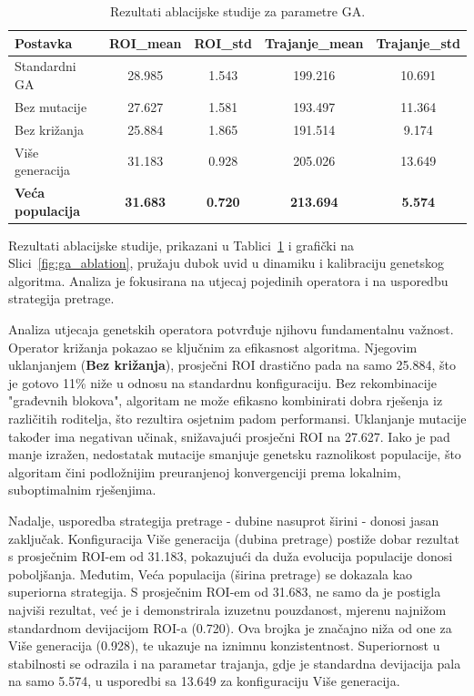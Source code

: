 \begin{table}[H]
    \centering
    \caption{Rezultati ablacijske studije za parametre GA.}
    \label{tab:ga_ablation}
    \begin{tabular}{|l|c|c|c|c|}
        \hline
        \textbf{Postavka} & \textbf{ROI\_mean} & \textbf{ROI\_std} & \textbf{Trajanje\_mean} & \textbf{Trajanje\_std} \\
        \hline
        Standardni GA & 28.985 & 1.543 & 199.216 & 10.691 \\
        Bez mutacije & 27.627 & 1.581 & 193.497 & 11.364 \\
        Bez križanja & 25.884 & 1.865 & 191.514 & 9.174 \\
        Više generacija & 31.183 & 0.928 & 205.026 & 13.649 \\
        \textbf{Veća populacija} & \textbf{31.683} & \textbf{0.720} & \textbf{213.694} & \textbf{5.574} \\
        \hline
    \end{tabular}
\end{table}

Rezultati ablacijske studije, prikazani u Tablici~\ref{tab:ga_ablation} i grafički na Slici~\ref{fig:ga_ablation}, pružaju dubok uvid u dinamiku i kalibraciju genetskog algoritma. Analiza je fokusirana na utjecaj pojedinih operatora i na usporedbu strategija pretrage.

Analiza utjecaja genetskih operatora potvrđuje njihovu fundamentalnu važnost. Operator križanja pokazao se ključnim za efikasnost algoritma. Njegovim uklanjanjem (\textbf{Bez križanja}), prosječni ROI drastično pada na samo 25.884, što je gotovo 11\% niže u odnosu na standardnu konfiguraciju. Bez rekombinacije "građevnih blokova", algoritam ne može efikasno kombinirati dobra rješenja iz različitih roditelja, što rezultira osjetnim padom performansi. Uklanjanje mutacije također ima negativan učinak, snižavajući prosječni ROI na 27.627. Iako je pad manje izražen, nedostatak mutacije smanjuje genetsku raznolikost populacije, što algoritam čini podložnijim preuranjenoj konvergenciji prema lokalnim, suboptimalnim rješenjima.

Nadalje, usporedba strategija pretrage - dubine nasuprot širini - donosi jasan zaključak. Konfiguracija Više generacija (dubina pretrage) postiže dobar rezultat s prosječnim ROI-em od 31.183, pokazujući da duža evolucija populacije donosi poboljšanja. Međutim, Veća populacija (širina pretrage) se dokazala kao superiorna strategija. S prosječnim ROI-em od 31.683, ne samo da je postigla najviši rezultat, već je i demonstrirala izuzetnu pouzdanost, mjerenu najnižom standardnom devijacijom ROI-a (0.720). Ova brojka je značajno niža od one za Više generacija (0.928), te ukazuje na iznimnu konzistentnost. Superiornost u stabilnosti se odrazila i na parametar trajanja, gdje je standardna devijacija pala na samo 5.574, u usporedbi sa 13.649 za konfiguraciju Više generacija.

